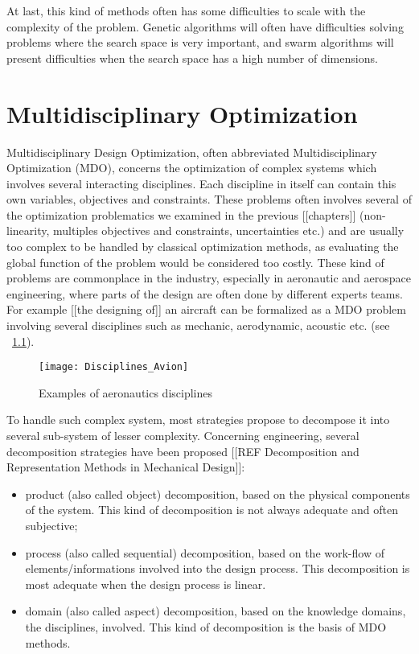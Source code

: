 At last, this kind of methods often has some difficulties to scale with the complexity of the problem. Genetic algorithms will often have difficulties solving problems where the search space is very important, and swarm algorithms will present difficulties when the search space has a high number of dimensions.

\chapter{Multidisciplinary Optimization}

Multidisciplinary Design Optimization, often abbreviated Multidisciplinary Optimization (MDO), concerns the optimization of complex systems which involves several interacting disciplines. Each discipline in itself can contain this own variables, objectives and constraints. These problems often involves several of the optimization problematics we examined in the previous [[chapters]] (non-linearity, multiples objectives and constraints, uncertainties etc.) and are usually too complex to be handled by classical optimization methods, as evaluating the global function of the problem would be considered too costly.
These kind of problems are commonplace in the industry, especially in aeronautic and aerospace engineering, where parts of the design are often done by different experts teams. For example [[the designing of]] an aircraft can be formalized as a MDO problem involving several disciplines such as mechanic, aerodynamic, acoustic etc. (see \figurename\ \ref{aero-disc}).

\begin{figure}
\centering
\texttt{[image: Disciplines\_Avion]}
\caption{Examples of aeronautics disciplines}
\label{aero-disc}
\end{figure}

To handle such complex system, most strategies propose to decompose it into several sub-system of lesser complexity. Concerning engineering, several decomposition strategies have been proposed [[REF Decomposition and Representation Methods in Mechanical Design]]:

\begin{itemize}
\item product (also called object) decomposition, based on the physical components of the system. This kind of decomposition is not always adequate and often subjective;
\item process  (also called sequential) decomposition, based on the work-flow of elements/informations involved into the design process. This decomposition is most adequate when the design process is linear.
\item domain (also called aspect) decomposition, based on the knowledge domains, the disciplines, involved. This kind of decomposition is the basis of MDO methods.
\end{itemize}

